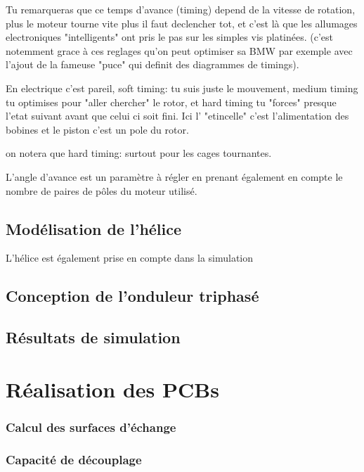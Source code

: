 \documentclass[a4paper,12pt]{book}
\begin{document}
Tu remarqueras que ce temps d'avance (timing) depend de la vitesse de rotation, plus le moteur tourne vite plus il faut declencher tot, et c'est là que les allumages electroniques "intelligents" ont pris le pas sur les simples vis platinées. (c'est notemment grace à ces reglages qu'on peut optimiser sa BMW par exemple avec l'ajout de la fameuse "puce" qui definit des diagrammes de timings).

En electrique c'est pareil, soft timing: tu suis juste le mouvement, medium timing tu optimises pour "aller chercher" le rotor, et hard timing tu "forces" presque l'etat suivant avant que celui ci soit fini.
Ici l' "etincelle" c'est l'alimentation des bobines et le piston c'est un pole du rotor.

on notera que hard timing: surtout pour les cages tournantes.

					L'angle d'avance est un paramètre à régler en prenant également en compte le nombre de paires de pôles du moteur utilisé.
		
			
			
				\subsection{Modélisation de l'hélice}
				
				L'hélice est également prise en compte dans la simulation 
				
				
				 
		\subsection{Conception de l'onduleur triphasé}
		
		\subsection{Résultats de simulation}
		
		
	\section{Réalisation des PCBs}
		
			\subsubsection{Calcul des surfaces d'échange}			
			
			\subsubsection{Capacité de découplage}
				 
\end{document}
